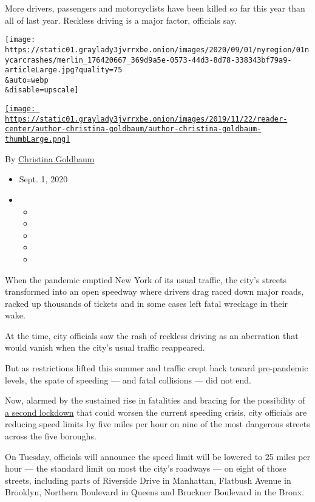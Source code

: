More drivers, passengers and motorcyclists have been killed so far this
year than all of last year. Reckless driving is a major factor,
officials say.

\texttt{[image: https://static01.graylady3jvrrxbe.onion/images/2020/09/01/nyregion/01nycarcrashes/merlin\_176420667\_369d9a5e-0573-44d3-8d78-338343bf79a9-articleLarge.jpg?quality=75\\\&auto=webp\\\&disable=upscale]}

\href{https://www.nytimes3xbfgragh.onion/by/christina-goldbaum}{\texttt{[image: https://static01.graylady3jvrrxbe.onion/images/2019/11/22/reader-center/author-christina-goldbaum/author-christina-goldbaum-thumbLarge.png]}}

By
\href{https://www.nytimes3xbfgragh.onion/by/christina-goldbaum}{Christina
Goldbaum}

\begin{itemize}
\item
  Sept. 1, 2020
\item
  \begin{itemize}
  \item
  \item
  \item
  \item
  \item
  \end{itemize}
\end{itemize}

When the pandemic emptied New York of its usual traffic, the city's
streets transformed into an open speedway where drivers drag raced down
major roads, racked up thousands of tickets and in some cases left fatal
wreckage in their wake.

At the time, city officials saw the rash of reckless driving as an
aberration that would vanish when the city's usual traffic reappeared.

But as restrictions lifted this summer and traffic crept back toward
pre-pandemic levels, the spate of speeding --- and fatal collisions ---
did not end.

Now, alarmed by the sustained rise in fatalities and bracing for the
possibility of
\href{https://www.nytimes3xbfgragh.onion/2020/08/17/nyregion/coronavirus-second-wave-nyc.html}{a
second lockdown} that could worsen the current speeding crisis, city
officials are reducing speed limits by five miles per hour on nine of
the most dangerous streets across the five boroughs.

On Tuesday, officials will announce the speed limit will be lowered to
25 miles per hour --- the standard limit on most the city's roadways ---
on eight of those streets, including parts of Riverside Drive in
Manhattan, Flatbush Avenue in Brooklyn, Northern Boulevard in Queens and
Bruckner Boulevard in the Bronx.

